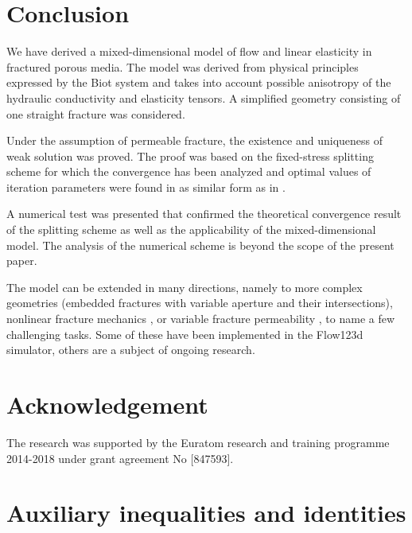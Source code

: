 \documentclass[a4paper]{article}
\numberwithin{equation}{section}
\begin{document}
\section*{Conclusion}
We have derived a mixed-dimensional model of flow and linear elasticity in fractured porous media.
The model was derived from physical principles expressed by the Biot system and takes into account possible anisotropy of the hydraulic conductivity and elasticity tensors.
A simplified geometry consisting of one straight fracture was considered.

Under the assumption of permeable fracture, the existence and uniqueness of weak solution was proved.
The proof was based on the fixed-stress splitting scheme for which the convergence has been analyzed and optimal values of iteration parameters were found in as similar form as in \cite{both2017robust}.

A numerical test was presented that confirmed the theoretical convergence result of the splitting scheme as well as the applicability of the mixed-dimensional model.
The analysis of the numerical scheme is beyond the scope of the present paper.

The model can be extended in many directions, namely to more complex geometries (embedded fractures with variable aperture and their intersections), nonlinear fracture mechanics \cite{berge2019finite}, or variable fracture permeability \cite{Watanabe2012lower}, to name a few challenging tasks.
Some of these have been implemented in the Flow123d simulator, others are a subject of ongoing research.


\section*{Acknowledgement}
The research was supported by the Euratom research and training programme 2014-2018 under grant agreement No [847593].

\appendix
{}

\section{Auxiliary inequalities and identities}\label{sec:ap_ineq}
\end{document}
